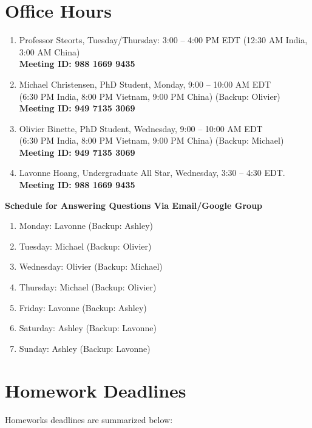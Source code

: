 \documentclass[11pt]{article}
\begin{document}
\section{Office Hours}
\begin{enumerate}
\item Professor Steorts, Tuesday/Thursday: 3:00 -- 4:00 PM EDT (12:30 AM India, 3:00 AM China) \\
\textbf{Meeting ID: 988 1669 9435}
\item Michael Christensen, PhD Student, Monday, 9:00 -- 10:00 AM EDT \\(6:30 PM India, 8:00 PM Vietnam, 9:00 PM China) (Backup: Olivier)\\
\textbf{Meeting ID: 949 7135 3069}
\item Olivier Binette, PhD Student, Wednesday, 9:00 -- 10:00 AM EDT \\(6:30 PM India, 8:00 PM Vietnam, 9:00 PM China) (Backup: Michael)\\
\textbf{Meeting ID: 949 7135 3069}
\item Lavonne Hoang, Undergraduate All Star, Wednesday, 3:30 -- 4:30 EDT. \\
\textbf{Meeting ID: 988 1669 9435}
\end{enumerate}


\textbf{Schedule for Answering Questions Via Email/Google Group}
\begin{enumerate}
\item Monday: Lavonne (Backup: Ashley)
\item Tuesday: Michael (Backup: Olivier)
\item Wednesday: Olivier (Backup: Michael)
\item Thursday: Michael (Backup: Olivier)
\item Friday: Lavonne (Backup: Ashley)
\item Saturday: Ashley (Backup: Lavonne)
\item Sunday: Ashley (Backup: Lavonne)
\end{enumerate}

\section{Homework Deadlines}
Homeworks deadlines are summarized below:
\end{document}
